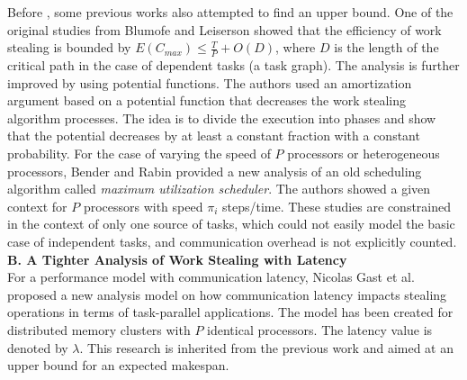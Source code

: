 Before \cite{tchiboukdjian2010tighter,tchiboukdjian2013decentralized}, some previous works also attempted to find an upper bound. One of the original studies from Blumofe and Leiserson \cite{Blumofe1999OriginWS} showed that the efficiency of work stealing is bounded by $E(C_{max}) \leq \frac{T}{P} + O(D)$, where $D$ is the length of the critical path in the case of dependent tasks (a task graph). The analysis is further improved by \cite{arora2001thread} using potential functions. The authors used an amortization argument based on a potential function that decreases the work stealing algorithm processes. The idea is to divide the execution into phases and show that the potential decreases by at least a constant fraction with a constant probability. For the case of varying the speed of $P$ processors or heterogeneous processors, Bender and Rabin \cite{bender2002online} provided a new analysis of an old scheduling algorithm called \textit{maximum utilization scheduler}. The authors showed a given context for $P$ processors with speed $\pi_{i}$ steps/time. These studies are constrained in the context of only one source of tasks, which could not easily model the basic case of independent tasks, and communication overhead is not explicitly counted.\\

\noindent \textbf{B. A Tighter Analysis of Work Stealing with Latency \cite{gast2021analysis}} \\

For a performance model with communication latency, Nicolas Gast et al. \cite{gast2021analysis} proposed a new analysis model on how communication latency impacts stealing operations in terms of task-parallel applications. The model has been created for distributed memory clusters with $P$ identical processors. The latency value is denoted by $\lambda$. This research is inherited from the previous work \cite{tchiboukdjian2013decentralized} and aimed at an upper bound for an expected makespan.\\

